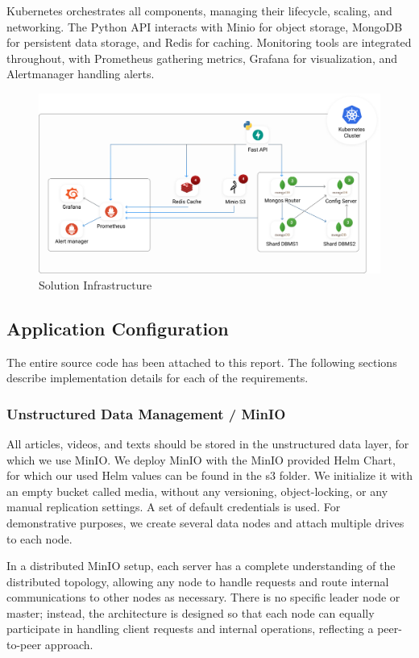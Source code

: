 \documentclass{report}
\begin{document}
    Kubernetes orchestrates all components, managing their lifecycle, scaling, and networking. The Python API interacts with Minio for object storage, MongoDB for persistent data storage, and Redis for caching. Monitoring tools are integrated throughout, with Prometheus gathering metrics, Grafana for visualization, and Alertmanager handling alerts.

    \begin{figure}[H]
        \centering
        \includegraphics[width=\textwidth]{images/architecture}
        \caption{Solution Infrastructure}
        \label{fig:cluster}
    \end{figure}

    \subsection{Application Configuration}

    The entire source code has been attached to this report. The following sections describe implementation details for each of the requirements.

    \subsubsection{Unstructured Data Management / MinIO}
    All articles, videos, and texts should be stored in the unstructured data layer, for which we use MinIO. We deploy MinIO with the MinIO provided Helm Chart, for which our used Helm values can be found in the s3 folder. We initialize it with an empty bucket called media, without any versioning, object-locking, or any manual replication settings. A set of default credentials is used. For demonstrative purposes, we create several data nodes and attach multiple drives to each node.

    In a distributed MinIO setup, each server has a complete understanding of the distributed topology, allowing any node to handle requests and route internal communications to other nodes as necessary. There is no specific leader node or master; instead, the architecture is designed so that each node can equally participate in handling client requests and internal operations, reflecting a peer-to-peer approach.
\end{document}

